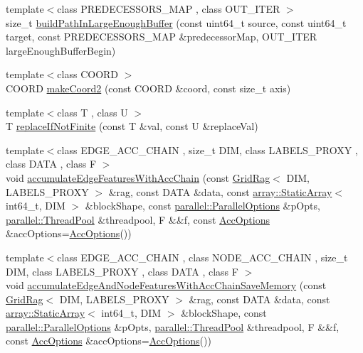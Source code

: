 \begin{DoxyCompactItemize}
\item 
{\footnotesize template$<$class P\+R\+E\+D\+E\+C\+E\+S\+S\+O\+R\+S\+\_\+\+M\+A\+P , class O\+U\+T\+\_\+\+I\+T\+E\+R $>$ }\\size\+\_\+t \hyperlink{namespacenifty_1_1graph_ad5fff1c63a572469a352e1645f9d3d0c}{build\+Path\+In\+Large\+Enough\+Buffer} (const uint64\+\_\+t source, const uint64\+\_\+t target, const P\+R\+E\+D\+E\+C\+E\+S\+S\+O\+R\+S\+\_\+\+M\+A\+P \&predecessor\+Map, O\+U\+T\+\_\+\+I\+T\+E\+R large\+Enough\+Buffer\+Begin)
\item 
{\footnotesize template$<$class C\+O\+O\+R\+D $>$ }\\C\+O\+O\+R\+D \hyperlink{namespacenifty_1_1graph_aca62625e3c61b810e2f6cda338de2c26}{make\+Coord2} (const C\+O\+O\+R\+D \&coord, const size\+\_\+t axis)
\item 
{\footnotesize template$<$class T , class U $>$ }\\T \hyperlink{namespacenifty_1_1graph_a511023b23336eb0591905cc2034b00a5}{replace\+If\+Not\+Finite} (const T \&val, const U \&replace\+Val)
\item 
{\footnotesize template$<$class E\+D\+G\+E\+\_\+\+A\+C\+C\+\_\+\+C\+H\+A\+I\+N , size\+\_\+t D\+I\+M, class L\+A\+B\+E\+L\+S\+\_\+\+P\+R\+O\+X\+Y , class D\+A\+T\+A , class F $>$ }\\void \hyperlink{namespacenifty_1_1graph_a367cdb1cc5ac050b60098dc22effd452}{accumulate\+Edge\+Features\+With\+Acc\+Chain} (const \hyperlink{classnifty_1_1graph_1_1GridRag}{Grid\+Rag}$<$ D\+I\+M, L\+A\+B\+E\+L\+S\+\_\+\+P\+R\+O\+X\+Y $>$ \&rag, const D\+A\+T\+A \&data, const \hyperlink{namespacenifty_1_1array_a683f151f19c851754e0c6d55ed16a0c2}{array\+::\+Static\+Array}$<$ int64\+\_\+t, D\+I\+M $>$ \&block\+Shape, const \hyperlink{classnifty_1_1parallel_1_1ParallelOptions}{parallel\+::\+Parallel\+Options} \&p\+Opts, \hyperlink{classnifty_1_1parallel_1_1ThreadPool}{parallel\+::\+Thread\+Pool} \&threadpool, F \&\&f, const \hyperlink{structnifty_1_1graph_1_1AccOptions}{Acc\+Options} \&acc\+Options=\hyperlink{structnifty_1_1graph_1_1AccOptions}{Acc\+Options}())
\item 
{\footnotesize template$<$class E\+D\+G\+E\+\_\+\+A\+C\+C\+\_\+\+C\+H\+A\+I\+N , class N\+O\+D\+E\+\_\+\+A\+C\+C\+\_\+\+C\+H\+A\+I\+N , size\+\_\+t D\+I\+M, class L\+A\+B\+E\+L\+S\+\_\+\+P\+R\+O\+X\+Y , class D\+A\+T\+A , class F $>$ }\\void \hyperlink{namespacenifty_1_1graph_a8bba7bf00968cb611c2b01bddfe6f2fd}{accumulate\+Edge\+And\+Node\+Features\+With\+Acc\+Chain\+Save\+Memory} (const \hyperlink{classnifty_1_1graph_1_1GridRag}{Grid\+Rag}$<$ D\+I\+M, L\+A\+B\+E\+L\+S\+\_\+\+P\+R\+O\+X\+Y $>$ \&rag, const D\+A\+T\+A \&data, const \hyperlink{namespacenifty_1_1array_a683f151f19c851754e0c6d55ed16a0c2}{array\+::\+Static\+Array}$<$ int64\+\_\+t, D\+I\+M $>$ \&block\+Shape, const \hyperlink{classnifty_1_1parallel_1_1ParallelOptions}{parallel\+::\+Parallel\+Options} \&p\+Opts, \hyperlink{classnifty_1_1parallel_1_1ThreadPool}{parallel\+::\+Thread\+Pool} \&threadpool, F \&\&f, const \hyperlink{structnifty_1_1graph_1_1AccOptions}{Acc\+Options} \&acc\+Options=\hyperlink{structnifty_1_1graph_1_1AccOptions}{Acc\+Options}())

\end{DoxyCompactItemize}

